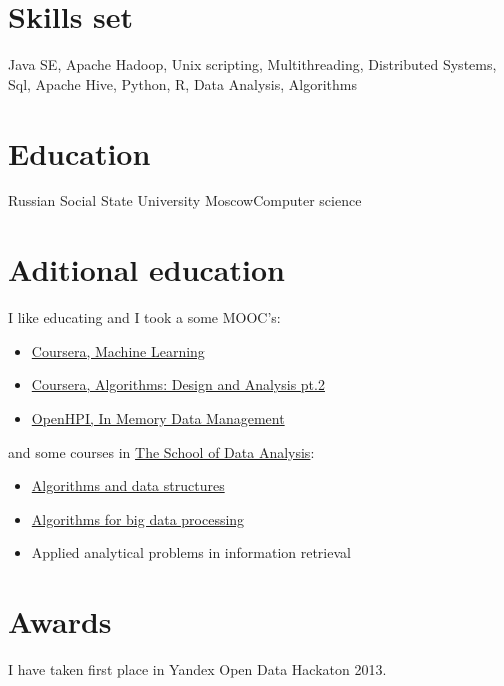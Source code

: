 \documentclass[xetex]{moderncv}
\begin{document}
\section{Skills set}
Java SE, Apache Hadoop, Unix scripting, Multithreading, Distributed Systems, Sql, Apache Hive, Python, R, Data Analysis, Algorithms

\pagebreak

\section{Education}
 {Russian Social State University} {Moscow}{}{Computer science}

\section {Aditional education}

I like educating and I took a some MOOC's:  
\begin{itemize}
\item \href{https://www.dropbox.com/s/ey4kpuspil6ez54/Statement\%20of\%20Accomplishment.pdf}{Coursera, Machine Learning }
\item \href{https://www.dropbox.com/s/ot8hvdck28tyoj4/AlgoDA2.pdf}{Coursera,  Algorithms: Design and Analysis pt.2 }
\item \href{https://www.dropbox.com/s/ikqocsfb94sot51/in_memory_data_management_certificate_full_15656.pdf}{OpenHPI, In Memory Data Management }
\end{itemize}
and some courses in \href{http://shad.yandex.ru/?ncrnd=6964}{The School of Data Analysis}:
\begin{itemize}
\item \href{http://shad.yandex.ru/program/algorithms1.xml}{ Algorithms and data structures}
\item \href{http://shad.yandex.ru/program/algorithms3.xml}{ Algorithms for big data processing}
\item Applied analytical problems in information retrieval
\end{itemize} 
\section {Awards}
I have taken first place in Yandex Open Data Hackaton 2013.
\end{document}
